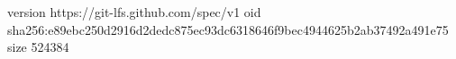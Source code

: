 version https://git-lfs.github.com/spec/v1
oid sha256:e89ebc250d2916d2dedc875ec93dc6318646f9bec4944625b2ab37492a491e75
size 524384
